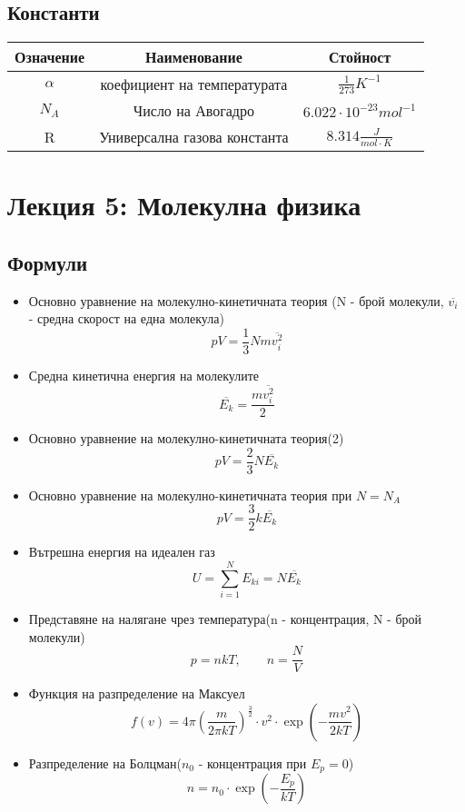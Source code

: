 \documentclass[fleqn, 12pt]{article}
\theoremstyle{definition}
\begin{document}
\newpage
\subsection{Константи}

\begin{center}
\begin{tabular}{ |c|c|c|}
\hline
\textbf{Означение} & \textbf{Наименование}&\textbf{Стойност}\\
\hline
$\alpha$ & коефициент на температурата & $\frac{1}{273} K^{-1}$\\
\hline
$N_A$ & Число на Авогадро & $6.022 \cdot 10^{-23} mol^{-1}$\\
\hline
R & Универсална газова константа & $8.314 \frac{J}{mol \cdot K}$\\
\hline
\end{tabular}
\end{center}

\newpage
\section{Лекция 5: Молекулна физика}

\subsection{Формули}
\begin{itemize}
\item Основно уравнение на молекулно-кинетичната теория (N - брой молекули, $\overline{v_i}$ - средна скорост на една молекула)
$$pV = \frac{1}{3} Nm \overline{v_i ^2}$$
\item Средна кинетична енергия на молекулите
$$\overline{E_k} = \frac{m \overline{v_i ^2}}{2}$$
\item Основно уравнение на молекулно-кинетичната теория(2)
$$pV = \frac{2}{3} N\overline{E_k}$$
\item Основно уравнение на молекулно-кинетичната теория при $N = N_A$
$$pV = \frac{3}{2} k \overline{E_k}$$
\item Вътрешна енергия на идеален газ
$$U = \sum_{i=1} ^N E_{ki} = N \overline{E_k}$$
\item Представяне на налягане чрез температура(n - концентрация, N - брой молекули)
$$p = nkT, \qquad n = \frac{N}{V}$$
\item Функция на разпределение на Максуел
$$f(v) = 4 \pi \left( \frac{m}{2 \pi k T}\right)^{\frac{3}{2}} \cdot v^2 \cdot \exp \left(- \frac{m v^2}{2 k T} \right)$$
\item Разпределение на Болцман($n_0$ - концентрация при $E_p = 0$)
$$n = n_0 \cdot \exp \left( - \frac{E_p}{kT}\right)$$
\end{itemize}
\end{document}
